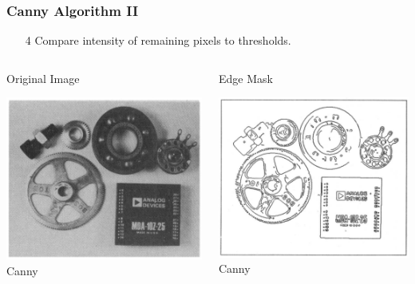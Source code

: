 \documentclass{beamer}
\begin{document}
\begin{frame}
\frametitle{Canny Algorithm II}
\begin{enumerate}
\item[4] Compare intensity of remaining pixels to thresholds.
\end{enumerate}
\begin{columns}
\begin{column}{0.5\textwidth}
Original Image
\begin{center}
\includegraphics[width=1\textwidth]{before_edge_detection}
\linebreak
{\tiny Canny}
\end{center}
\end{column}
\begin{column}{0.5\textwidth}
Edge Mask
\begin{center}
\includegraphics[width=1\textwidth]{after_edge_detection}
\linebreak
{\tiny Canny}
\end{center}
\end{column}
\end{columns}
\end{frame}
\end{document}
